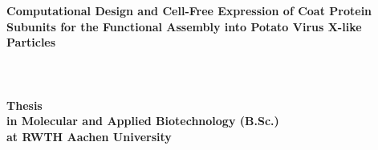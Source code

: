 \documentclass[12pt]{article}
\begin{document}
\begin{titlepage}
    \begin{figure}[t]
        
    \end{figure}
   \begin{center}
        \vspace*{1cm}
       \textbf{\huge Computational Design and Cell-Free Expression of Coat Protein Subunits for the Functional Assembly into Potato Virus X-like Particles}
       \paragraph{}$~~$\\
       \paragraph{}$~~$\\
       \paragraph{}$~~$\\
       \textbf{Thesis} \\ 
       \textbf{in Molecular and Applied Biotechnology (B.Sc.)} \\ 
       \textbf{at RWTH Aachen University}
       \paragraph{}$~~$\\
       \paragraph{}$~~$\\
       \paragraph{}$~~$\\
        \\
        \\
        \\
        \\
       \paragraph{}$~~$\\
            
   \end{center}
\end{titlepage}
\end{document}

